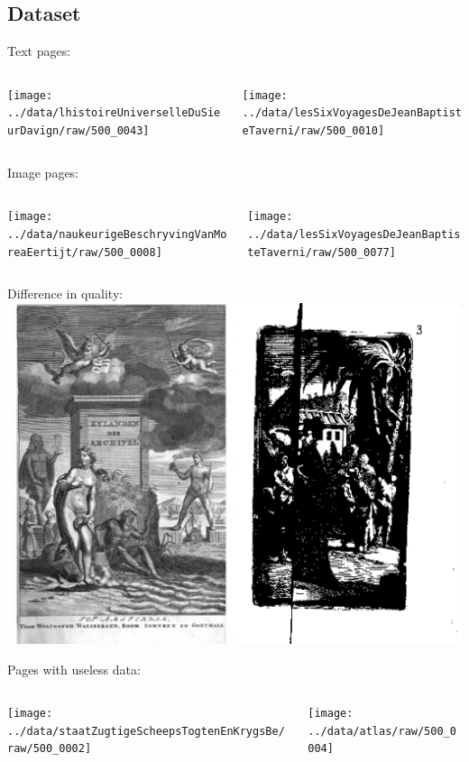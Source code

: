 \subsection{Dataset}
{
	Text pages:
	\begin{columns}
		\begin{column}{.5\textwidth}
			\texttt{[image: ../data/lhistoireUniverselleDuSieurDavign/raw/500\_0043]}
		\end{column}
		\begin{column}{.5\textwidth}
			\texttt{[image: ../data/lesSixVoyagesDeJeanBaptisteTaverni/raw/500\_0010]}
		\end{column}
	\end{columns}
}
{
	Image pages:
	\begin{columns}
		\begin{column}{.5\textwidth}
			\texttt{[image: ../data/naukeurigeBeschryvingVanMoreaEertijt/raw/500\_0008]}
		\end{column}
		\begin{column}{.5\textwidth}
			\texttt{[image: ../data/lesSixVoyagesDeJeanBaptisteTaverni/raw/500\_0077]}
		\end{column}
	\end{columns}
}
{
	Difference in quality:
	\includegraphics[width=.8\paperwidth]{resources/example2}
}
{
	Pages with useless data:
	\begin{columns}
		\begin{column}{.5\textwidth}
			\texttt{[image: ../data/staatZugtigeScheepsTogtenEnKrygsBe/raw/500\_0002]}
		\end{column}
		\begin{column}{.5\textwidth}
			\texttt{[image: ../data/atlas/raw/500\_0004]}
		\end{column}
	\end{columns}
}
